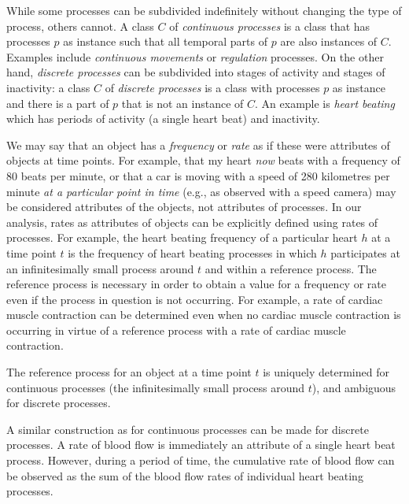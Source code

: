 \documentclass{bioinfo}
\begin{document}
While some processes can be subdivided indefinitely without changing
the type of process, others cannot. A class $C$ of {\em continuous
  processes} is a class that has processes $p$ as instance such that
all temporal parts of $p$ are also instances of $C$. Examples include
{\em continuous movements} or {\em regulation} processes. On the other
hand, {\em discrete processes} can be subdivided into stages of
activity and stages of inactivity: a class $C$ of {\em discrete
  processes} is a class with processes $p$ as instance and there is a
part of $p$ that is not an instance of $C$. An example is {\em heart
  beating} which has periods of activity (a single heart beat) and
inactivity.



We may say that an object has a {\em frequency} or {\em rate} as if
these were attributes of objects at time points. For example, that my
heart {\em now} beats with a frequency of 80 beats per minute, or that
a car is moving with a speed of 280 kilometres per minute {\em at a
  particular point in time} (e.g., as observed with a speed camera)
may be considered attributes of the objects, not attributes of
processes. In our analysis, rates as attributes of objects can be
explicitly defined using rates of processes. For example, the heart
beating frequency of a particular heart $h$ at a time point $t$ is the
frequency of heart beating processes in which $h$ participates at an
infinitesimally small process around $t$ and within a reference
process. The reference process is necessary in order to obtain a value
for a frequency or rate even if the process in question is not
occurring. For example, a rate of cardiac muscle contraction can be
determined even when no cardiac muscle contraction is occurring in
virtue of a reference process with a rate of cardiac muscle
contraction.

The reference process for an object at a time point $t$ is uniquely
determined for continuous processes (the infinitesimally small process
around $t$), and ambiguous for discrete processes.


A similar construction as for continuous processes can be made for
discrete processes. A rate of blood flow is immediately an attribute
of a single heart beat process. However, during a period of time, the
cumulative rate of blood flow can be observed as the sum of the blood
flow rates of individual heart beating processes.
\end{document}
